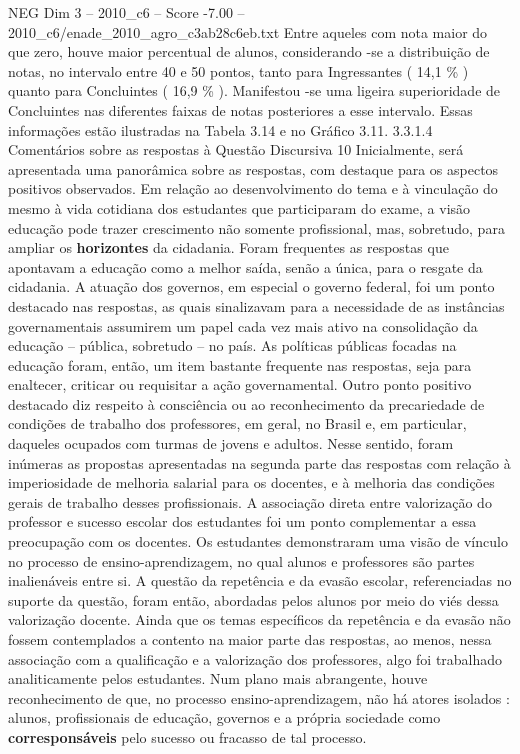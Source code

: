 \begin{textsample}{NEG Dim 3 – 2010\_c6 – Score -7.00 – 2010\_c6/enade\_2010\_agro\_c3ab28c6eb.txt}
Entre aqueles com nota maior do que zero, houve maior percentual de alunos, considerando -se a distribuição de notas, no intervalo entre 40 e 50 pontos, tanto para Ingressantes ( 14,1 \% ) quanto para Concluintes ( 16,9 \% ).
Manifestou -se uma ligeira superioridade de Concluintes nas diferentes faixas de notas posteriores a esse intervalo.
Essas informações estão ilustradas na Tabela 3.14 e no Gráfico 3.11. 3.3.1.4 Comentários sobre as respostas à Questão Discursiva 10 Inicialmente, será apresentada uma panorâmica sobre as respostas, com destaque para os aspectos positivos observados.
Em relação ao desenvolvimento do tema e à vinculação do mesmo à vida cotidiana dos estudantes que participaram do exame, a visão educação pode trazer crescimento não somente profissional, mas, sobretudo, para ampliar os \textbf{horizontes} da cidadania.
Foram frequentes as respostas que apontavam a educação como a melhor saída, senão a única, para o resgate da cidadania.
A atuação dos governos, em especial o governo federal, foi um ponto destacado nas respostas, as quais sinalizavam para a necessidade de as instâncias governamentais assumirem um papel cada vez mais ativo na consolidação da educação – pública, sobretudo – no país.
As políticas públicas focadas na educação foram, então, um item bastante frequente nas respostas, seja para enaltecer, criticar ou requisitar a ação governamental.
Outro ponto positivo destacado diz respeito à consciência ou ao reconhecimento da precariedade de condições de trabalho dos professores, em geral, no Brasil e, em particular, daqueles ocupados com turmas de jovens e adultos.
Nesse sentido, foram inúmeras as propostas apresentadas na segunda parte das respostas com relação à imperiosidade de melhoria salarial para os docentes, e à melhoria das condições gerais de trabalho desses profissionais.
A associação direta entre valorização do professor e sucesso escolar dos estudantes foi um ponto complementar a essa preocupação com os docentes.
Os estudantes demonstraram uma visão de vínculo no processo de ensino-aprendizagem, no qual alunos e professores são partes inalienáveis entre si.
A questão da repetência e da evasão escolar, referenciadas no suporte da questão, foram então, abordadas pelos alunos por meio do viés dessa valorização docente.
Ainda que os temas específicos da repetência e da evasão não fossem contemplados a contento na maior parte das respostas, ao menos, nessa associação com a qualificação e a valorização dos professores, algo foi trabalhado analiticamente pelos estudantes.
Num plano mais abrangente, houve reconhecimento de que, no processo ensino-aprendizagem, não há atores isolados : alunos, profissionais de educação, governos e a própria sociedade como \textbf{corresponsáveis} pelo sucesso ou fracasso de tal processo.

\end{textsample}
